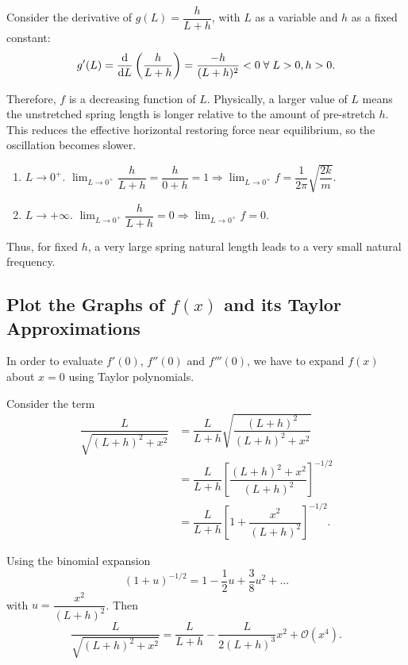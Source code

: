\documentclass[12pt, a4paper]{report}
\begin{document}
	Consider the derivative of $g(L) = \dfrac{h}{L + h}$, with $L$ as a variable and $h$ as a fixed constant:
	\begin{equation*}
		g'(L) = \odv*{\left(\dfrac{h}{L + h}\right)}{L} = \frac{-h}{(L + h)^2} < 0 \; \forall \; L > 0, h > 0.
	\end{equation*}
	
	Therefore, $f$ is a decreasing function of $L$. Physically, a larger value of $L$ means the unstretched spring length is longer relative to the amount of pre-stretch $h$. This reduces the effective horizontal restoring force near equilibrium, so the oscillation becomes slower.
	
	\begin{enumerate}[label=\textbf{Case \arabic*:}]
		\item $L \to 0^+$. $\displaystyle \lim_{L \to 0^+} \dfrac{h}{L + h} = \dfrac{h}{0 + h} = 1 \Rightarrow \lim_{L \to 0^+} f = \dfrac{1}{2\pi} \sqrt{\dfrac{2k}{m}}.$
		
		\item $L \to +\infty$. $\displaystyle \lim_{L \to 0^+} \dfrac{h}{L + h} = 0 \Rightarrow \lim_{L \to 0^+} f = 0.$
	\end{enumerate}
	
	Thus, for fixed $h$, a very large spring natural length leads to a very small natural frequency.
	
	\subsection{Plot the Graphs of $f(x)$ and its Taylor Approximations}
	In order to evaluate $f'(0)$, $f''(0)$ and $f'''(0)$, we have to expand $f(x)$ about $x = 0$ using Taylor polynomials.
	
	Consider the term
	\begin{align*}
		\dfrac{L}{\sqrt{(L + h)^2 + x^2}} &= \dfrac{L}{L + h}  \sqrt{\dfrac{(L + h)^2}{(L + h)^2 + x^2}} \\
		&= \dfrac{L}{L + h} \left[ \dfrac{(L + h)^2 + x^2}{(L + h)^2} \right]^{-1/2} \\
		&= \dfrac{L}{L + h} \left[ 1 + \dfrac{x^2}{(L + h)^2} \right]^{-1/2}.
	\end{align*}
	
	Using the binomial expansion
	\begin{equation*}
		\left( 1 + u \right)^{-1/2} = 1 - \frac{1}{2}u + \frac{3}{8}u^2 + \dots
	\end{equation*}
	with $u = \dfrac{x^2}{(L + h)^2}$. Then
	\begin{equation*}
		\dfrac{L}{\sqrt{(L + h)^2 + x^2}} = \dfrac{L}{L + h} - \dfrac{L}{2(L + h)^3}x^2 + \mathcal{O}(x^4).
	\end{equation*}
	
\end{document}
